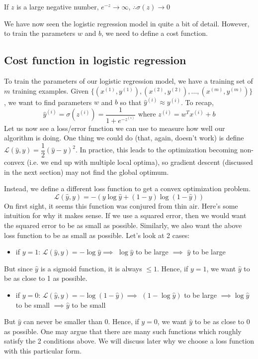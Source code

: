 \documentclass{article}[a4paper,12pt]
\theoremstyle{definition}
\newcommand{\Lagr}{\mathcal{L}}
\begin{document}
If $z$ is a large negative number, $e^{-z}\rightarrow \infty$, $\therefore\sigma(z)\rightarrow 0$
\vspace{6pt}

We have now seen the logistic regression model in quite a bit of detail. However, to train the parameters $w$ and $b$, we need to define a cost function.
\subsection{Cost function in logistic regression}
To train the parameters of our logistic regression model, we have a training set of $m$ training examples. Given $\{(x^{(1)},y^{(1)}), (x^{(2)},y^{(2)}), \dots, (x^{(m)},y^{(m)})\}$, we want to find parameters $w$ and $b$ so that $\hat{y}^{(i)}\approx y^{(i)}$. To recap, $$\hat{y}^{(i)}=\sigma(z^{(i)})=\dfrac{1}{1+e^{-z^{(i)}}}\text{ where }z^{(i)}=w^Tx^{(i)}+b$$
Let us now see a loss/error function we can use to measure how well our algorithm is doing. One thing we could do (that, again, doesn't work) is define $\Lagr(\hat{y},y)=\dfrac{1}{2}(\hat{y}-y)^2$. In practice, this leads to the optimization becoming non-convex (i.e. we end up with multiple local optima), so gradient descent (discussed in the next section) may not find the global optimum.
\vspace{6pt}

Instead, we define a different loss function to get a convex optimization problem. 
$$\boxed{\Lagr(\hat{y},y)=-(y\log\hat{y}+(1-y)\log(1-\hat{y}))}$$
On first sight, it seems this function was conjured from thin air. Here's some intuition for why it makes sense. If we use a squared error, then we would want the squared error to be as small as possible. Similarly, we also want the above loss function to be as small as possible. Let's look at 2 cases: 
\begin{itemize}
	\item if $y=1$: $\Lagr(\hat{y},y)=-\log\hat{y}\implies$ $\log\hat{y}$ to be large $\implies$  $\hat{y}$ to be large
\end{itemize}
But since $\hat{y}$ is a sigmoid function, it is always $\leqslant 1$. Hence, if $y=1$, we want $\hat{y}$ to be as close to 1 as possible.
\begin{itemize}
	\item if $y=0$: $\Lagr(\hat{y},y)=-\log(1-\hat{y})\implies$ $(1-\log\hat{y})$ to be large $\implies \log\hat{y}$ to be small $\implies \hat{y}$ to be small
\end{itemize}
But $\hat{y}$ can never be smaller than 0. Hence, if $y=0$, we want $\hat{y}$ to be as close to 0 as possible. One may argue that there are many such functions which roughly satisfy the 2 conditions above. We will discuss later why we choose a loss function with this particular form.
\vspace{6pt}
\end{document}
